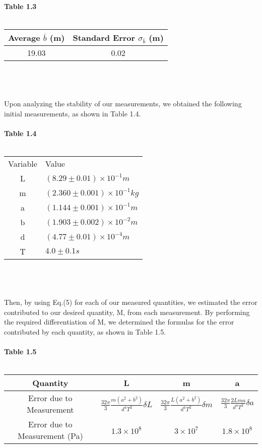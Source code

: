 \documentclass[12pt, leqno]{article}
\begin{document}
\textbf{Table 1.3}\\\\
\begin{tabular}{|c|c|}
	\hline
	Average $\bar{b}$ (m) & Standard Error $\sigma_{\bar{b}}$ (m)\\
	\hline
	19.03 & 0.02\\
	\hline
\end{tabular}\\\\\\
Upon analyzing the stability of our measurements, we obtained the following initial measurements, as shown in Table 1.4.\\\\
\textbf{Table 1.4}\\\\
\begin{tabular}{c|l}
Variable & Value\\
L & $(8.29\pm0.01)\times10^{-1} m$\\
m & $(2.360\pm0.001)\times 10^{-1} kg$\\
a & $(1.144\pm0.001)\times10^{-1} m$\\
b & $(1.903\pm0.002)\times10^{-2} m$\\
d & $(4.77\pm0.01)\times10^{-4} m$\\
T & $4.0 \pm 0.1 s$\\
\end{tabular}\\\\\\
Then, by using Eq.(5) for each of our measured quantities, we estimated the error contributed to our desired quantity, M, from each measurement.
By performing the required differentiation of M, we determined the formulas for the error contributed by each quantity, as shown in Table 1.5.\\\\
\textbf{Table 1.5}\\\\
\begin{tabular}{|c|c|c|c|}
	\hline
	Quantity & L & m & a\\
	\hline
	Error due to Measurement& $\frac{32\pi}{3}\frac{m(a^2+b^2)}{d^4 T^2}\delta L$ & $\frac{32\pi}{3}\frac{L(a^2+b^2)}{d^4 T^2}\delta m$ & $\frac{32\pi}{3}\frac{2Lma}{d^4 T^2}\delta a$  \\
\hline
Error due to Measurement (Pa)& $1.3\times10^8$ & $3\times10^7$ & $1.8\times10^8$\\
\hline
\end{tabular}
\end{document}
